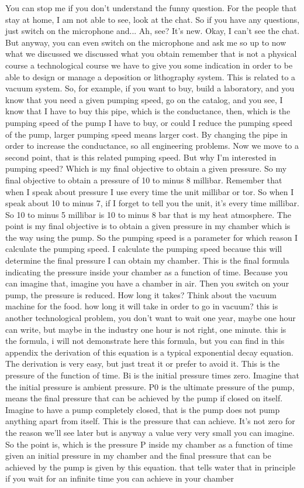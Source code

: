 You can stop me if you don't understand the funny question. For the people that stay at home, I am not able to see, look at the chat. So if you have any questions, just switch on the microphone and... Ah, see? It's new. Okay, I can't see the chat. But anyway, you can even switch on the microphone and ask me so up to now what we discussed we discussed what you obtain remember that is not a physical course a technological course we have to give you some indication in order to be able to design or manage a deposition or lithography system. This is related to a vacuum system. So, for example, if you want to buy, build a laboratory, and you know that you need a given pumping speed, go on the catalog, and you see, I know that I have to buy this pipe, which is the conductance, then, which is the pumping speed of the pump I have to buy, or could I reduce the pumping speed of the pump, larger pumping speed means larger cost. By changing the pipe in order to increase the conductance, so all engineering problems. Now we move to a second point, that is this related pumping speed. But why I'm interested in pumping speed? Which is my final objective to obtain a given pressure. So my final objective to obtain a pressure of 10 to minus 8 millibar. Remember that when I speak about pressure I use every time the unit millibar or tor. So when I speak about 10 to minus 7, if I forget to tell you the unit, it's every time millibar. So 10 to minus 5 millibar is 10 to minus 8 bar that is my heat atmosphere. The point is my final objective is to obtain a given pressure in my chamber which is the way using the pump. So the pumping speed is a parameter for which reason I calculate the pumping speed. I calculate the pumping speed because this will determine the final pressure I can obtain my chamber. This is the final formula indicating the pressure inside your chamber as a function of time. Because you can imagine that, imagine you have a chamber in air. Then you switch on your pump, the pressure is reduced. How long it takes? Think about the vacuum machine for the food. how long it will take in order to go in vacuum? this is another technological problem, you don't want to wait one year, maybe one hour can write, but maybe in the industry one hour is not right, one minute. this is the formula, i will not demonstrate here this formula, but you can find in this appendix the derivation of this equation is a typical exponential decay equation. The derivation is very easy, but just treat it or prefer to avoid it. This is the pressure of the function of time. Bi is the initial pressure times zero. Imagine that the initial pressure is ambient pressure. P0 is the ultimate pressure of the pump, means the final pressure that can be achieved by the pump if closed on itself. Imagine to have a pump completely closed, that is the pump does not pump anything apart from itself. This is the pressure that can achieve. It's not zero for the reason we'll see later but is anyway a value very very small you can imagine. So the point is, which is the pressure P inside my chamber as a function of time given an initial pressure in my chamber and the final pressure that can be achieved by the pump is given by this equation. that tells water that in principle if you wait for an infinite time you can achieve in your chamber 